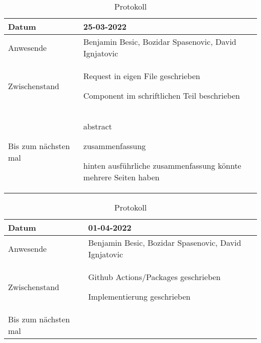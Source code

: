 \begin{table}
    \begin{tabular}{ |p{3cm}|p{10cm}|   }
        \hline
        Datum & 25-03-2022\\
        \hline
        Anwesende & Benjamin Besic, Bozidar Spasenovic, David Ignjatovic\\

        \hline
        Zwischenstand& 

        Request in eigen File geschrieben
    
        Component im schriftlichen Teil beschrieben
    
    \\
        \hline
        Bis zum nächsten mal & 

        abstract
    
        zusammenfassung
    
        hinten ausführliche zusammenfassung könnte mehrere Seiten haben
    
     \\
        \hline
    \end{tabular}
    \caption{Protokoll}
    \label{tab:my_label}
\end{table}
\begin{table}
    \begin{tabular}{ |p{3cm}|p{10cm}|   }
        \hline
        Datum & 01-04-2022\\
        \hline
        Anwesende & Benjamin Besic, Bozidar Spasenovic, David Ignjatovic\\

        \hline
        Zwischenstand& 

        Github Actions/Packages geschrieben
    
        Implementierung geschrieben
    
    \\
        \hline
        Bis zum nächsten mal &  
    
    \\
        \hline
    \end{tabular}
    \caption{Protokoll}
    \label{tab:my_label}
\end{table}